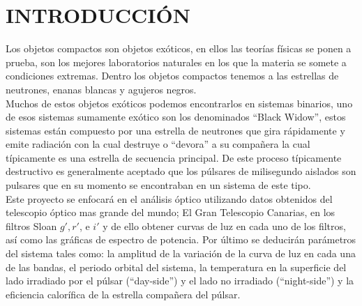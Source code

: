 \chapter*{INTRODUCCIÓN}

Los objetos compactos son objetos exóticos, en ellos las teorías físicas se ponen a prueba, son los mejores laboratorios naturales en los que la materia se somete a condiciones extremas. Dentro los objetos compactos tenemos a las estrellas de neutrones, enanas blancas y agujeros negros. \\

Muchos de estos objetos exóticos podemos encontrarlos en sistemas binarios, uno de esos sistemas sumamente exótico son los denominados ``Black Widow'', estos sistemas están compuesto por una estrella de neutrones que gira rápidamente y emite radiación con la cual destruye o ``devora'' a su compa\~nera la cual típicamente es una estrella de secuencia principal. De este proceso típicamente destructivo es generalmente aceptado que los p\'ulsares de milisegundo aislados son pulsares que en su momento se encontraban en un sistema de este tipo.\\


Este proyecto se enfocar\'a en el análisis óptico utilizando datos obtenidos del telescopio óptico mas grande del mundo; El Gran Telescopio Canarias, en los filtros Sloan $g', r'$, e $i'$ y de ello obtener curvas de luz en cada uno de los filtros, as\'i como las gráficas de espectro de potencia. Por \'ultimo se deducirán parámetros  del sistema tales como:  la amplitud de la variación de la curva de luz en cada una de las bandas, el periodo orbital del sistema, la temperatura en la superficie del lado irradiado por el p\'ulsar (``day-side'') y el lado no irradiado (``night-side'') y la eficiencia calorífica de la estrella compa\~nera del p\'ulsar.







